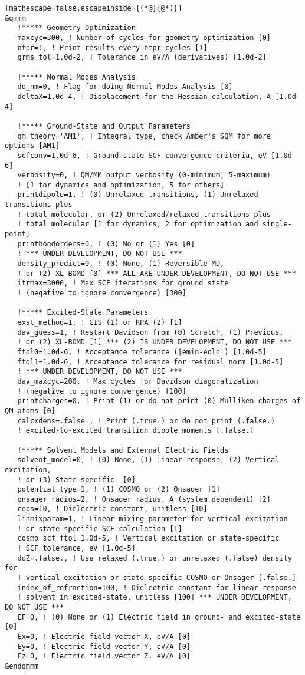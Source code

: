 \begin{lstlisting}[mathescape=false,escapeinside={(*@}{@*)}]
&qmmm
   !***** Geometry Optimization
   maxcyc=300, ! Number of cycles for geometry optimization [0]
   ntpr=1, ! Print results every ntpr cycles [1]
   grms_tol=1.0d-2, ! Tolerance in eV/A (derivatives) [1.0d-2]

   !***** Normal Modes Analysis
   do_nm=0, ! Flag for doing Normal Modes Analysis [0]
   deltaX=1.0d-4, ! Displacement for the Hessian calculation, A [1.0d-4]

   !***** Ground-State and Output Parameters
   qm_theory='AM1', ! Integral type, check Amber's SQM for more options [AM1]
   scfconv=1.0d-6, ! Ground-state SCF convergence criteria, eV [1.0d-6]
   verbosity=0, ! QM/MM output verbosity (0-minimum, 5-maximum)
   ! [1 for dynamics and optimization, 5 for others]
   printdipole=1, ! (0) Unrelaxed transitions, (1) Unrelaxed transitions plus
   ! total molecular, or (2) Unrelaxed/relaxed transitions plus
   ! total molecular [1 for dynamics, 2 for optimization and single-point]
   printbondorders=0, ! (0) No or (1) Yes [0]
   ! *** UNDER DEVELOPMENT, DO NOT USE ***
   density_predict=0, ! (0) None, (1) Reversible MD,
   ! or (2) XL-BOMD [0] *** ALL ARE UNDER DEVELOPMENT, DO NOT USE ***
   itrmax=3000, ! Max SCF iterations for ground state
   ! (negative to ignore convergence) [300]

   !***** Excited-State Parameters
   exst_method=1, ! CIS (1) or RPA (2) [1]
   dav_guess=1, ! Restart Davidson from (0) Scratch, (1) Previous,
   ! or (2) XL-BOMD [1] *** (2) IS UNDER DEVELOPMENT, DO NOT USE ***
   ftol0=1.0d-6, ! Acceptance tolerance (|emin-eold|) [1.0d-5]
   ftol1=1.0d-6, ! Acceptance tolerance for residual norm [1.0d-5]
   ! *** UNDER DEVELOPMENT, DO NOT USE ***
   dav_maxcyc=200, ! Max cycles for Davidson diagonalization
   ! (negative to ignore convergence) [100]
   printcharges=0, ! Print (1) or do not print (0) Mulliken charges of QM atoms [0]
   calcxdens=.false., ! Print (.true.) or do not print (.false.)
   ! excited-to-excited transition dipole moments [.false.]

   !***** Solvent Models and External Electric Fields
   solvent_model=0, ! (0) None, (1) Linear response, (2) Vertical excitation,
   ! or (3) State-specific  [0]
   potential_type=1, ! (1) COSMO or (2) Onsager [1]
   onsager_radius=2, ! Onsager radius, A (system dependent) [2]
   ceps=10, ! Dielectric constant, unitless [10]
   linmixparam=1, ! Linear mixing parameter for vertical excitation
   ! or state-specific SCF calculation [1]
   cosmo_scf_ftol=1.0d-5, ! Vertical excitation or state-specific
   ! SCF tolerance, eV [1.0d-5]
   doZ=.false., ! Use relaxed (.true.) or unrelaxed (.false) density for
   ! vertical excitation or state-specific COSMO or Onsager [.false.]
   index_of_refraction=100, ! Dielectric constant for linear response
   ! solvent in excited-state, unitless [100] *** UNDER DEVELOPMENT, DO NOT USE ***
   EF=0, ! (0) None or (1) Electric field in ground- and excited-state [0]
   Ex=0, ! Electric field vector X, eV/A [0]
   Ey=0, ! Electric field vector Y, eV/A [0]
   Ez=0, ! Electric field vector Z, eV/A [0]
&endqmmm


\end{lstlisting}
